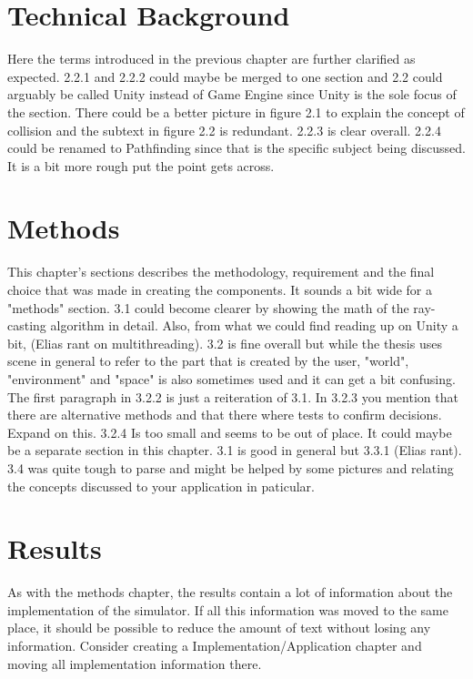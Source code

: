 \documentclass[12pt,a4paper,twoside,openright]{report}
\begin{document}
\section*{Technical Background}

	Here the terms introduced in the previous chapter are further clarified as
	expected. 2.2.1 and 2.2.2 could maybe be merged to one section and 2.2
	could arguably be called Unity instead of Game Engine since Unity is the
	sole focus of the section. There could be a better picture in figure 2.1 to
	explain the concept of collision and the subtext in figure 2.2 is
	redundant. 2.2.3 is clear overall. 2.2.4 could be renamed to Pathfinding
	since that is the specific subject being discussed. It is a bit more rough
	put the point gets across.

\section*{Methods}

	This chapter's sections describes the methodology, requirement and the
	final choice that was made in creating the components. It sounds a bit wide
	for a "methods" section. 3.1 could become clearer by showing the math of
	the ray-casting algorithm in detail. Also, from what we could find reading
	up on Unity a bit, (Elias rant on multithreading). 3.2 is fine overall but
	while the thesis uses scene in general to refer to the part that is created
	by the user, "world", "environment" and "space" is also sometimes used and
	it can get a bit confusing. The first paragraph in 3.2.2 is just a
	reiteration of 3.1. In 3.2.3 you mention that there are alternative methods
	and that there where tests to confirm decisions. Expand on this. 3.2.4 Is
	too small and seems to be out of place. It could maybe be a separate
	section in this chapter. 3.1 is good in general but 3.3.1 (Elias rant). 3.4
	was quite tough to parse and might be helped by some pictures and relating
	the concepts discussed to your application in paticular.

\section*{Results}

	As with the methods chapter, the results contain a lot of information about
	the implementation of the simulator. If all this information was moved to
	the same place, it should be possible to reduce the amount of text without
	losing any information. Consider creating a Implementation/Application 
	chapter and moving all implementation information there.
\end{document}

